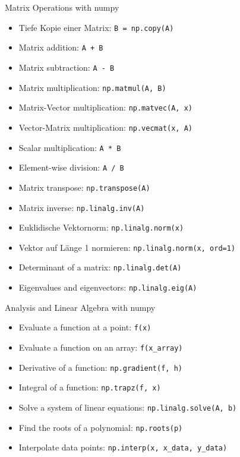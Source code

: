 \begin{concept}{Matrix Operations with numpy}
    \begin{itemize}
        \item Tiefe Kopie einer Matrix: \texttt{B = np.copy(A)}
        \item Matrix addition: \texttt{A + B}
        \item Matrix subtraction: \texttt{A - B}
        \item Matrix multiplication: \texttt{np.matmul(A, B)}
        \item Matrix-Vector multiplication: \texttt{np.matvec(A, x)}
        \item Vector-Matrix multiplication: \texttt{np.vecmat(x, A)}
        \item Scalar multiplication: \texttt{A * B}
        \item Element-wise division: \texttt{A / B}
        \item Matrix transpose: \texttt{np.transpose(A)}
        \item Matrix inverse: \texttt{np.linalg.inv(A)}
        \item Euklidische Vektornorm: \texttt{np.linalg.norm(x)}
        \item Vektor auf Länge 1 normieren: \texttt{np.linalg.norm(x, ord=1)}
        \item Determinant of a matrix: \texttt{np.linalg.det(A)}
        \item Eigenvalues and eigenvectors: \texttt{np.linalg.eig(A)}
    \end{itemize}
\end{concept}

\begin{theorem}{Analysis and Linear Algebra with numpy}
    \begin{itemize}
        \item Evaluate a function at a point: \texttt{f(x)}
        \item Evaluate a function on an array: \texttt{f(x\_array)}
        \item Derivative of a function: \texttt{np.gradient(f, h)}
        \item Integral of a function: \texttt{np.trapz(f, x)}
        \item Solve a system of linear equations: \texttt{np.linalg.solve(A, b)}
        \item Find the roots of a polynomial: \texttt{np.roots(p)}
        \item Interpolate data points: \texttt{np.interp(x, x\_data, y\_data)}
    \end{itemize}
\end{theorem}

